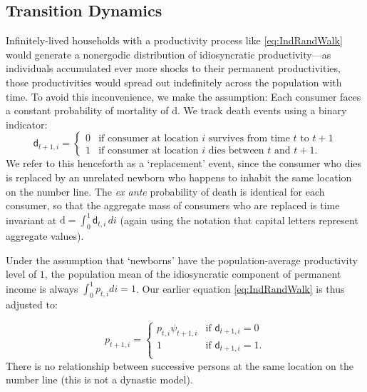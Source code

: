 \documentclass[titlepage]{./econtex}
\begin{document}
\subsection{Transition Dynamics}

Infinitely-lived households with a productivity process like \eqref{eq:IndRandWalk} would generate a nonergodic distribution of idiosyncratic productivity---as individuals accumulated ever more shocks to their permanent productivities, those productivities would spread out indefinitely across the population with time. To avoid this inconvenience, we make the \cite{blanchardFinite} assumption: Each consumer faces a constant probability of mortality of $\mathrm{d}$. We track death events using a binary indicator:
\begin{equation*}
\mathsf{d}_{t+1,i} =
  \begin{cases}
    0 & \text{if consumer at location $i$ survives from time $t$ to $t+1$}
\\    1 & \text{if consumer at location $i$ dies between $t$ and $t+1$}.
  \end{cases}
\end{equation*}
We refer to this henceforth as a `replacement' event, since the consumer who dies is replaced by an unrelated newborn who happens to inhabit the same location on the number line.  The {\it ex ante} probability of death is identical for each consumer, so that the aggregate mass of consumers who are replaced is time invariant at $\mathrm{d} = \int_{0}^{1} \mathsf{d}_{t,i}\,di$ (again using the notation that capital letters represent aggregate values).

Under the assumption that `newborns' have the population-average productivity level of $1$, the population mean of the idiosyncratic component of permanent income is always $\int_{0}^{1} {p}_{t,i}di = 1$. Our earlier equation \eqref{eq:IndRandWalk} is thus adjusted to:

\begin{equation*}  
{p}_{t+1,i} =
  \begin{cases}
       {p}_{t,i} \psi_{t+1,i} & \text{if } \mathsf{d}_{t+1,i} = 0 \\
    1 & \text{if } \mathsf{d}_{t+1,i} = 1. \\
  \end{cases}
\end{equation*}
 There is no relationship between successive persons at the same location on the number line (this is not a dynastic model).
\end{document}
